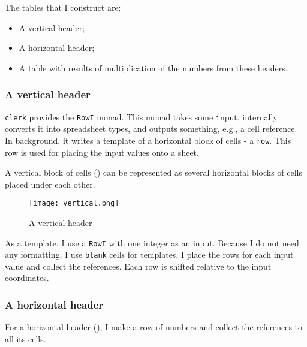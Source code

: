 The tables that I construct are:

\begin{itemize}
  \item A vertical header;
  \item A horizontal header;
  \item A table with results of multiplication of the numbers from these headers.
\end{itemize}

\subsubsection{A vertical header}

\texttt{clerk} provides the \texttt{RowI} monad.
This monad takes some \texttt{i}nput, internally converts it into spreadsheet types, and outputs something, e.g., a cell reference.
In background, it writes a template of a horizontal block of cells - a \texttt{row}.
This row is used for placing the input values onto a sheet.

A vertical block of cells () can be represented as several horizontal blocks of cells placed under each other.

\begin{figure}[h]
  \centering
  \texttt{[image: vertical.png]}
  \caption{A vertical header}
  \label{fig:vertical}
\end{figure}

As a template, I use a \texttt{RowI} with one integer as an input.
Because I do not need any formatting, I use \texttt{blank} cells for templates. I place the rows for each input value and collect the references.
Each row is shifted relative to the input coordinates.

\pagebreak


\subsubsection{A horizontal header}

For a horizontal header (), I make a row of numbers and collect the references to all its cells.


